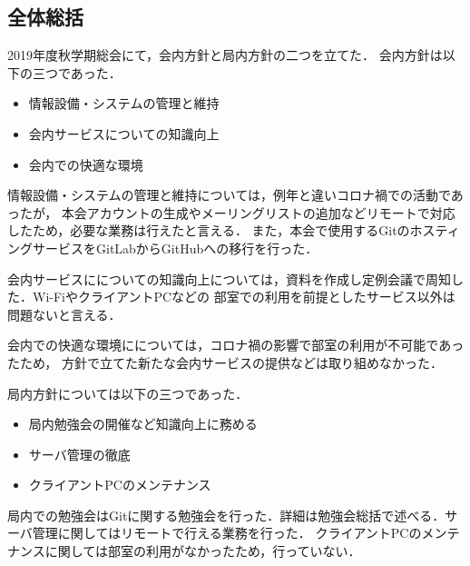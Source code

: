 \subsection*{全体総括}


2019年度秋学期総会にて，会内方針と局内方針の二つを立てた．
会内方針は以下の三つであった．
\begin{itemize}
    \item 情報設備・システムの管理と維持
    \item 会内サービスについての知識向上
    \item 会内での快適な環境
\end{itemize}

情報設備・システムの管理と維持については，例年と違いコロナ禍での活動であったが，
本会アカウントの生成やメーリングリストの追加などリモートで対応したため，必要な業務は行えたと言える．
また，本会で使用するGitのホスティングサービスをGitLabからGitHubへの移行を行った．

会内サービスにについての知識向上については，資料を作成し定例会議で周知した．Wi-FiやクライアントPCなどの
部室での利用を前提としたサービス以外は問題ないと言える．

会内での快適な環境にについては，コロナ禍の影響で部室の利用が不可能であったため，
方針で立てた新たな会内サービスの提供などは取り組めなかった．

局内方針については以下の三つであった．
\begin{itemize}
    \item 局内勉強会の開催など知識向上に務める
    \item サーバ管理の徹底
    \item クライアントPCのメンテナンス
\end{itemize}
  
局内での勉強会はGitに関する勉強会を行った．詳細は勉強会総括で述べる．サーバ管理に関してはリモートで行える業務を行った．
クライアントPCのメンテナンスに関しては部室の利用がなかったため，行っていない．